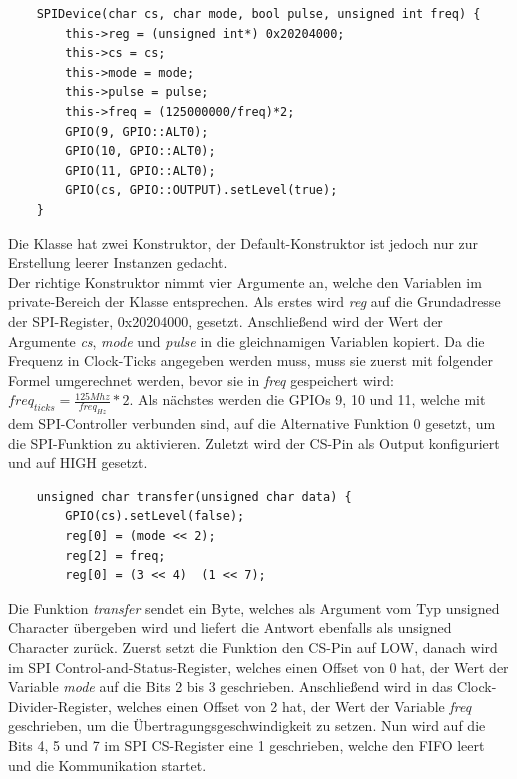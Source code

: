 \documentclass[12pt]{article}
\begin{document}
\begin{verbatim}
    SPIDevice(char cs, char mode, bool pulse, unsigned int freq) {
        this->reg = (unsigned int*) 0x20204000;
        this->cs = cs;
        this->mode = mode;
        this->pulse = pulse;
        this->freq = (125000000/freq)*2;
        GPIO(9, GPIO::ALT0);
        GPIO(10, GPIO::ALT0);
        GPIO(11, GPIO::ALT0);
        GPIO(cs, GPIO::OUTPUT).setLevel(true);
    }
\end{verbatim}
\vspace{-2mm}
Die Klasse hat zwei Konstruktor, der Default-Konstruktor ist jedoch nur zur Erstellung leerer Instanzen gedacht.\\
Der richtige Konstruktor nimmt vier Argumente an, welche den Variablen im private-Bereich der Klasse entsprechen. Als erstes wird \textit{reg} auf die Grundadresse der SPI-Register, 0x20204000, gesetzt. Anschließend wird der Wert der Argumente \textit{cs}, \textit{mode} und \textit{pulse} in die gleichnamigen Variablen kopiert. Da die Frequenz in Clock-Ticks angegeben werden muss, muss sie zuerst mit folgender Formel umgerechnet werden, bevor sie in \textit{freq} gespeichert wird: $freq_{ticks} = \frac{125 Mhz}{freq_{Hz}} * 2$. Als nächstes werden die GPIOs 9, 10 und 11, welche mit dem SPI-Controller verbunden sind, auf die Alternative Funktion 0 gesetzt, um die SPI-Funktion zu aktivieren. Zuletzt wird der CS-Pin als Output konfiguriert und auf HIGH gesetzt.\\
\begin{verbatim}
    unsigned char transfer(unsigned char data) {
        GPIO(cs).setLevel(false);
        reg[0] = (mode << 2);
        reg[2] = freq;
        reg[0] = (3 << 4)  (1 << 7);
\end{verbatim}
\vspace{-2mm}
Die Funktion \textit{transfer} sendet ein Byte, welches als Argument vom Typ unsigned Character
übergeben wird und liefert die Antwort ebenfalls als unsigned Character zurück. Zuerst setzt die Funktion den CS-Pin auf LOW, danach wird im SPI Control-and-Status-Register, welches einen Offset von 0 hat, der Wert der Variable \textit{mode} auf die Bits 2 bis 3 geschrieben. Anschließend wird in das Clock-Divider-Register, welches einen Offset von 2 hat, der Wert der Variable \textit{freq} geschrieben, um die Übertragungsgeschwindigkeit zu setzen. Nun wird auf die Bits 4, 5 und 7 im SPI CS-Register eine 1 geschrieben, welche den FIFO leert und die Kommunikation startet.\\\\\\
\end{document}
